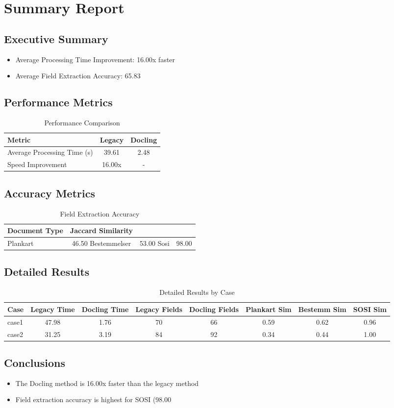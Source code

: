 \section{Summary Report}

\subsection{Executive Summary}
\begin{itemize}
\item Average Processing Time Improvement: 16.00x faster
\item Average Field Extraction Accuracy: 65.83%
\end{itemize}

\subsection{Performance Metrics}
\begin{table}[h]
\centering
\begin{tabular}{l|cc}
\hline
Metric & Legacy & Docling \\
\hline
Average Processing Time (s) & 39.61 & 2.48 \\
Speed Improvement & 16.00x & - \\
\hline
\end{tabular}
\caption{Performance Comparison}
\end{table}

\subsection{Accuracy Metrics}
\begin{table}[h]
\centering
\begin{tabular}{l|c}
\hline
Document Type & Jaccard Similarity \\
\hline
Plankart & 46.50%
Bestemmelser & 53.00%
Sosi & 98.00%
\hline
\end{tabular}
\caption{Field Extraction Accuracy}
\end{table}

\subsection{Detailed Results}
\begin{table}[h]
\centering
\begin{tabular}{l|cc|cc|ccc}
\hline
Case & Legacy Time & Docling Time & Legacy Fields & Docling Fields & Plankart Sim & Bestemm Sim & SOSI Sim \\
\hline
case1 & 47.98 & 1.76 & 70 & 66 & 0.59 & 0.62 & 0.96 \\
case2 & 31.25 & 3.19 & 84 & 92 & 0.34 & 0.44 & 1.00 \\
\hline
\end{tabular}
\caption{Detailed Results by Case}
\end{table}

\subsection{Conclusions}
\begin{itemize}
\item The Docling method is 16.00x faster than the legacy method
\item Field extraction accuracy is highest for SOSI (98.00%
\end{itemize}
